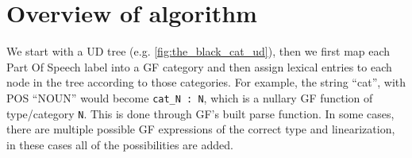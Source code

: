 


% 
% 
% 
% 

\section{Overview of algorithm}

We start with a UD tree (e.g. \autoref{fig:the_black_cat_ud}), then we first map each Part Of Speech label into a GF category and then assign lexical entries to each node in the tree according to those categories. For example, the string ``cat'', with POS ``NOUN'' would become \lstinline|cat_N : N|, which is a nullary GF function of type/category \lstinline|N|. This is done through GF's built parse function. In some cases, there are multiple possible GF expressions of the correct type and linearization, in these cases all of the possibilities are added.

